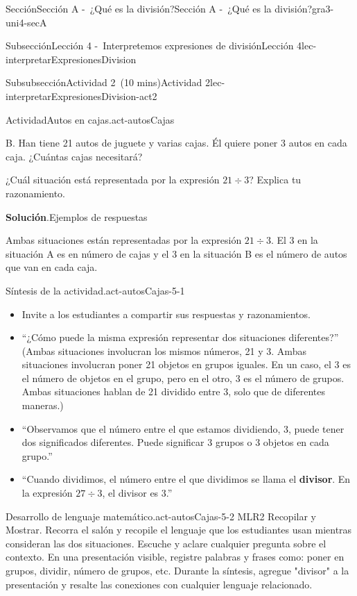 \documentclass[oneside,10pt,]{article}
\newcommand{\blocktitlefont}{\relax}
\newcommand{\terminology}[1]{\textbf{#1}}
\begin{document}
\begin{sectionptx}{Sección}{Sección A -~¿Qué es la división?}{}{Sección A -~¿Qué es la división?}{}{}{gra3-uni4-secA}
\begin{subsectionptx}{Subsección}{Lección 4 -~Interpretemos expresiones de división}{}{Lección 4}{}{}{lec-interpretarExpresionesDivision}
\begin{subsubsectionptx}{Subsubsección}{Actividad 2~(10 mins)}{}{Actividad 2}{}{}{lec-interpretarExpresionesDivision-act2}
\begin{activity}{Actividad}{Autos en cajas.}{act-autosCajas}
\begin{sidebyside}{2}{0.05}{0.05}{0.1}
\begin{sbspanel}{0.4}
\par
B. Han tiene 21 autos de juguete y varias cajas. Él quiere poner 3 autos en cada caja. ¿Cuántas cajas necesitará?%
\end{sbspanel}%
\end{sidebyside}%
\par
¿Cuál situación está representada por la expresión \(21\div 3\)? Explica tu razonamiento.%
\par\smallskip%
\noindent\textbf{\blocktitlefont Solución}.\hypertarget{act-autosCajas-3}{}\quad{}Ejemplos de respuestas%
\par
Ambas situaciones están representadas por la expresión \(21\div 3\). El 3 en la situación A es en número de cajas y el 3 en la situación B es el número de autos que van en cada caja.%
\end{activity}%
\par
\begin{paragraphs}{Síntesis de la actividad.}{act-autosCajas-5-1}%
%
\begin{itemize}[label=\textbullet]
\item{}Invite a los estudiantes a compartir sus respuestas y razonamientos.%
\item{}``¿Cómo puede la misma expresión representar dos situaciones diferentes?'' (Ambas situaciones involucran los mismos números, 21 y 3. Ambas situaciones involucran poner 21 objetos en grupos iguales. En un caso, el 3 es el número de objetos en el grupo, pero en el otro, 3 es el número de grupos. Ambas situaciones hablan de 21 dividido entre 3, solo que de diferentes maneras.)%
\item{}``Observamos que el número entre el que estamos dividiendo, 3, puede tener dos significados diferentes. Puede significar 3 grupos o 3 objetos en cada grupo.''%
\item{}``Cuando dividimos, el número entre el que dividimos se llama el \terminology{divisor}. En la expresión \(27\div 3\), el divisor es 3.''%
\end{itemize}
\end{paragraphs}%
\begin{paragraphs}{Desarrollo de lenguaje matemático.}{act-autosCajas-5-2}%
MLR2 Recopilar y Mostrar. Recorra el salón y recopile el lenguaje que los estudiantes usan mientras consideran las dos situaciones. Escuche y aclare cualquier pregunta sobre el contexto. En una presentación visible, registre palabras y frases como: poner en grupos, dividir, número de grupos, etc. Durante la síntesis, agregue "divisor" a la presentación y resalte las conexiones con cualquier lenguaje relacionado.%

\end{paragraphs}
\end{subsubsectionptx}
\end{subsectionptx}
\end{sectionptx}
\end{document}
